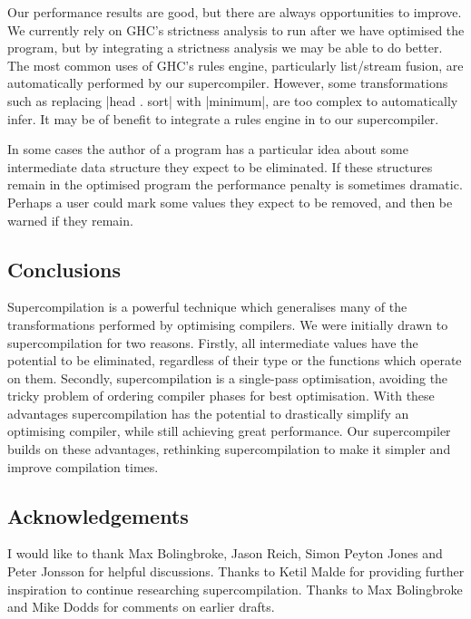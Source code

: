 \documentclass[draft]{sigplanconf}
\begin{document}
Our performance results are good, but there are always opportunities to improve. We currently rely on GHC's strictness analysis to run after we have optimised the program, but by integrating a strictness analysis we may be able to do better. The most common uses of GHC's rules engine, particularly list/stream fusion, are automatically performed by our supercompiler. However, some transformations such as replacing |head . sort| with |minimum|, are too complex to automatically infer. It may be of benefit to integrate a rules engine in to our supercompiler.

In some cases the author of a program has a particular idea about some intermediate data structure they expect to be eliminated. If these structures remain in the optimised program the performance penalty is sometimes dramatic. Perhaps a user could mark some values they expect to be removed, and then be warned if they remain.

\subsection{Conclusions}

Supercompilation is a powerful technique which generalises many of the transformations performed by optimising compilers. We were initially drawn to supercompilation for two reasons. Firstly, all intermediate values have the potential to be eliminated, regardless of their type or the functions which operate on them. Secondly, supercompilation is a single-pass optimisation, avoiding the tricky problem of ordering compiler phases for best optimisation. With these advantages supercompilation has the potential to drastically simplify an optimising compiler, while still achieving great performance. Our supercompiler builds on these advantages, rethinking supercompilation to make it simpler and improve compilation times.

\subsection*{Acknowledgements}

I would like to thank Max Bolingbroke, Jason Reich, Simon Peyton Jones and Peter Jonsson for helpful discussions. Thanks to Ketil Malde for providing further inspiration to continue researching supercompilation. Thanks to Max Bolingbroke and Mike Dodds for comments on earlier drafts.


\balance

\end{document}

